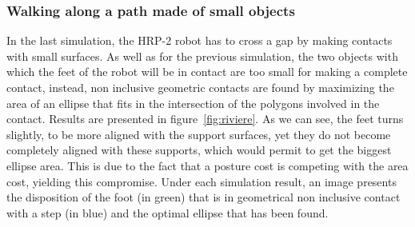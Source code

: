 


\subsubsection{Walking along a path made of small objects}
\label{subsubsec:riviere}


In the last simulation, the HRP-2 robot has to cross a gap by making contacts
with small surfaces.
As well as for the previous simulation, the two objects
with which the feet of the robot will be in contact are too small for making a
complete contact, instead, non inclusive geometric contacts are found by
maximizing the area of an ellipse that fits in the intersection of the polygons
involved in the contact.
Results are presented in figure~\ref{fig:riviere}.
As we can see, the feet turns slightly, to be more aligned with the support
surfaces, yet they do not become completely aligned with these supports, which would permit to get the biggest ellipse area.
This is due to the fact that a posture cost is competing with the area cost, yielding this compromise.
Under each simulation result, an image presents the disposition of the foot (in green) that is in geometrical non inclusive contact with a step (in blue) and the optimal ellipse that has been found.

